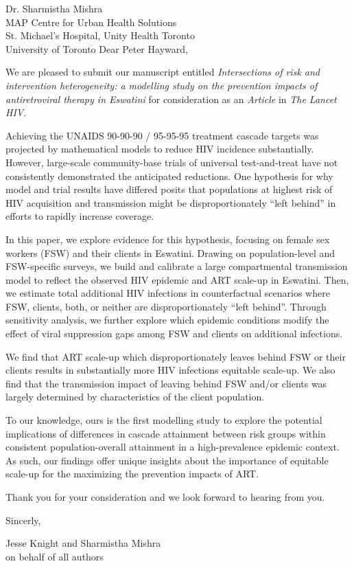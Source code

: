 \address{
  Peter Hayward\\
  Editor-in-Chief\\
  The Lancet HIV
}{Dr. Sharmistha Mishra\\
  MAP Centre for Urban Health Solutions\\
  St. Michael's Hospital, Unity Health Toronto\\
  University of Toronto}
Dear Peter Hayward,
\par
We are pleased to submit our manuscript entitled
\emph{Intersections of risk and intervention heterogeneity:
  a modelling study on the prevention impacts of antiretroviral therapy in Eswatini}
for consideration as an \emph{Article} in \emph{The Lancet HIV}.
\par
Achieving the UNAIDS 90-90-90 / 95-95-95 treatment cascade targets
was projected by mathematical models to reduce HIV incidence substantially.
However, large-scale community-base trials of universal test-and-treat
have not consistently demonstrated the anticipated reductions.
One hypothesis for why model and trial results have differed posits that
populations at highest risk of HIV acquisition and transmission might be
disproportionately ``left behind'' in efforts to rapidly increase coverage.
\par
In this paper, we explore evidence for this hypothesis,
focusing on female sex workers (FSW) and their clients in Eswatini.
Drawing on population-level and FSW-specific surveys,
we build and calibrate a large compartmental transmission model
to reflect the observed HIV epidemic and ART scale-up in Eswatini.
Then, we estimate total additional HIV infections in counterfactual scenarios where
FSW, clients, both, or neither are disproportionately ``left behind''.
Through sensitivity analysis, we further explore which epidemic conditions modify
the effect of viral suppression gaps among FSW and clients on additional infections.
\par
We find that ART scale-up which disproportionately leaves behind FSW or their clients
results in substantially more HIV infections \vs equitable scale-up.
We also find that the transmission impact of
leaving behind FSW and/or clients was largely determined by
characteristics of the client population.
\par
To our knowledge, ours is the first modelling study to explore
the potential implications of differences in cascade attainment between risk groups
within consistent population-overall attainment
in a high-prevalence epidemic context.
As such, our findings offer unique insights about
the importance of equitable scale-up
for the maximizing the prevention impacts of ART.
\par
Thank you for your consideration and we look forward to hearing from you.
\medskip\par
Sincerly,
\par
Jesse Knight and Sharmistha Mishra\\
on behalf of all authors
